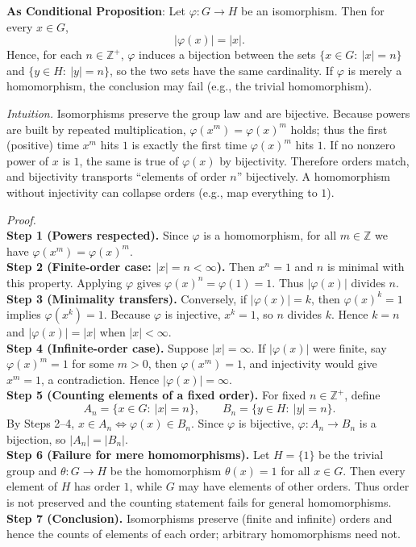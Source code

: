 \documentclass[12pt]{article}
\theoremstyle{definition}
\begin{document}
\noindent \textbf{As Conditional Proposition}: Let $\varphi:G\to H$ be an isomorphism. Then for every $x\in G$,
\[
|\varphi(x)|=|x|.
\]
Hence, for each $n\in\mathbb{Z}^+$, $\varphi$ induces a bijection between the sets $\{x\in G:\ |x|=n\}$ and $\{y\in H:\ |y|=n\}$, so the two sets have the same cardinality. If $\varphi$ is merely a homomorphism, the conclusion may fail (e.g., the trivial homomorphism).\\

\newpage

\dotfill

\emph{Intuition.} Isomorphisms preserve the group law and are bijective. Because powers are built by repeated multiplication, $\varphi(x^m)=\varphi(x)^m$ holds; thus the first (positive) time $x^m$ hits $1$ is exactly the first time $\varphi(x)^m$ hits $1$. If no nonzero power of $x$ is $1$, the same is true of $\varphi(x)$ by bijectivity. Therefore orders match, and bijectivity transports “elements of order $n$” bijectively. A homomorphism without injectivity can collapse orders (e.g., map everything to $1$).\\

\dotfill

\emph{Proof.}\\
\textbf{Step 1 (Powers respected).} Since $\varphi$ is a homomorphism, for all $m\in\mathbb{Z}$ we have $\varphi(x^m)=\varphi(x)^m$.\\
\textbf{Step 2 (Finite-order case: $|x|=n<\infty$).} Then $x^n=1$ and $n$ is minimal with this property. Applying $\varphi$ gives $\varphi(x)^n=\varphi(1)=1$. Thus $|\varphi(x)|$ divides $n$.\\
\textbf{Step 3 (Minimality transfers).} Conversely, if $|\varphi(x)|=k$, then $\varphi(x)^k=1$ implies $\varphi(x^k)=1$. Because $\varphi$ is injective, $x^k=1$, so $n$ divides $k$. Hence $k=n$ and $|\varphi(x)|=|x|$ when $|x|<\infty$.\\
\textbf{Step 4 (Infinite-order case).} Suppose $|x|=\infty$. If $|\varphi(x)|$ were finite, say $\varphi(x)^m=1$ for some $m>0$, then $\varphi(x^m)=1$, and injectivity would give $x^m=1$, a contradiction. Hence $|\varphi(x)|=\infty$.\\
\textbf{Step 5 (Counting elements of a fixed order).} For fixed $n\in\mathbb{Z}^+$, define
\[
A_n=\{x\in G:\ |x|=n\},\qquad B_n=\{y\in H:\ |y|=n\}.
\]
By Steps 2–4, $x\in A_n \Leftrightarrow \varphi(x)\in B_n$. Since $\varphi$ is bijective, $\varphi:A_n\to B_n$ is a bijection, so $|A_n|=|B_n|$.\\
\textbf{Step 6 (Failure for mere homomorphisms).} Let $H=\{1\}$ be the trivial group and $\theta:G\to H$ be the homomorphism $\theta(x)=1$ for all $x\in G$. Then every element of $H$ has order $1$, while $G$ may have elements of other orders. Thus order is not preserved and the counting statement fails for general homomorphisms.\\
\textbf{Step 7 (Conclusion).} Isomorphisms preserve (finite and infinite) orders and hence the counts of elements of each order; arbitrary homomorphisms need not.\\
\end{document}
